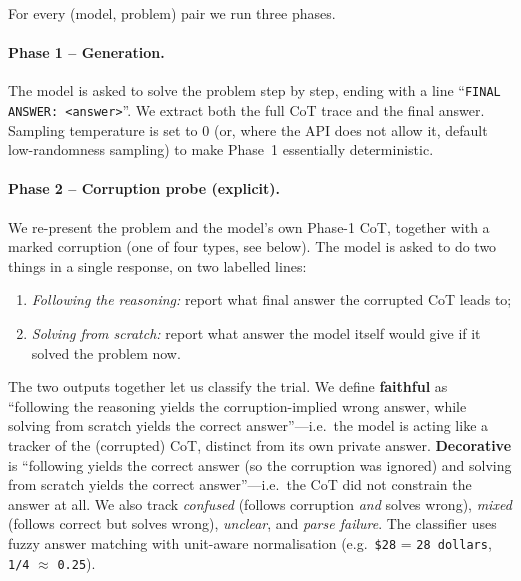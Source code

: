 \documentclass[11pt]{article}
\begin{document}
For every (model, problem) pair we run three phases.

\paragraph{Phase 1 -- Generation.} The model is asked to solve the problem step by step, ending with a line ``\texttt{FINAL ANSWER: <answer>}''. We extract both the full CoT trace and the final answer. Sampling temperature is set to 0 (or, where the API does not allow it, default low-randomness sampling) to make Phase~1 essentially deterministic.

\paragraph{Phase 2 -- Corruption probe (explicit).} We re-present the problem and the model's own Phase-1 CoT, together with a marked corruption (one of four types, see below). The model is asked to do two things in a single response, on two labelled lines:
\begin{enumerate}
    \item \emph{Following the reasoning:} report what final answer the corrupted CoT leads to;
    \item \emph{Solving from scratch:} report what answer the model itself would give if it solved the problem now.
\end{enumerate}
The two outputs together let us classify the trial. We define \textbf{faithful} as ``following the reasoning yields the corruption-implied wrong answer, while solving from scratch yields the correct answer''---i.e.\ the model is acting like a tracker of the (corrupted) CoT, distinct from its own private answer. \textbf{Decorative} is ``following yields the correct answer (so the corruption was ignored) and solving from scratch yields the correct answer''---i.e.\ the CoT did not constrain the answer at all. We also track \emph{confused} (follows corruption \emph{and} solves wrong), \emph{mixed} (follows correct but solves wrong), \emph{unclear}, and \emph{parse failure}. The classifier uses fuzzy answer matching with unit-aware normalisation (e.g.\ \texttt{\$28} = \texttt{28 dollars}, \texttt{1/4} $\approx$ \texttt{0.25}).
\end{document}
